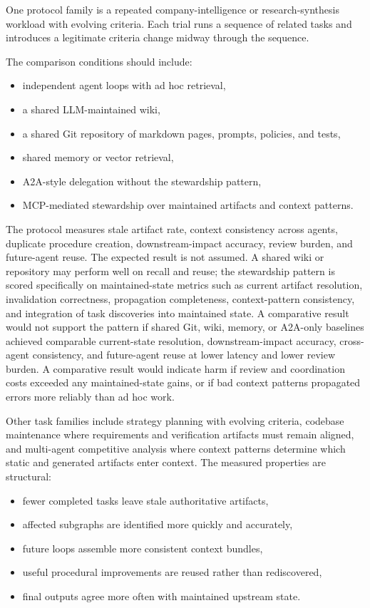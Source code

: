 \documentclass{article}
\begin{document}
One protocol family is a repeated company-intelligence or research-synthesis workload with evolving criteria. Each trial runs a sequence of related tasks and introduces a legitimate criteria change midway through the sequence.

The comparison conditions should include:
\begin{itemize}[leftmargin=*]
\item independent agent loops with ad hoc retrieval,
\item a shared LLM-maintained wiki,
\item a shared Git repository of markdown pages, prompts, policies, and tests,
\item shared memory or vector retrieval,
\item A2A-style delegation without the stewardship pattern,
\item MCP-mediated stewardship over maintained artifacts and context patterns.
\end{itemize}

The protocol measures stale artifact rate, context consistency across agents, duplicate procedure creation, downstream-impact accuracy, review burden, and future-agent reuse. The expected result is not assumed. A shared wiki or repository may perform well on recall and reuse; the stewardship pattern is scored specifically on maintained-state metrics such as current artifact resolution, invalidation correctness, propagation completeness, context-pattern consistency, and integration of task discoveries into maintained state. A comparative result would not support the pattern if shared Git, wiki, memory, or A2A-only baselines achieved comparable current-state resolution, downstream-impact accuracy, cross-agent consistency, and future-agent reuse at lower latency and lower review burden. A comparative result would indicate harm if review and coordination costs exceeded any maintained-state gains, or if bad context patterns propagated errors more reliably than ad hoc work.

Other task families include strategy planning with evolving criteria, codebase maintenance where requirements and verification artifacts must remain aligned, and multi-agent competitive analysis where context patterns determine which static and generated artifacts enter context. The measured properties are structural:
\begin{itemize}[leftmargin=*]
\item fewer completed tasks leave stale authoritative artifacts,
\item affected subgraphs are identified more quickly and accurately,
\item future loops assemble more consistent context bundles,
\item useful procedural improvements are reused rather than rediscovered,
\item final outputs agree more often with maintained upstream state.
\end{itemize}
\end{document}
